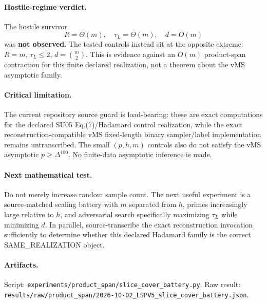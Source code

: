 \documentclass[11pt]{article}
\begin{document}
\paragraph{Hostile-regime verdict.}
The hostile survivor
\[
R=\Theta(m),\quad\tau_L=\Theta(m),\quad d=O(m)
\]
was \textbf{not observed}. The tested controls instead sit at the opposite extreme:
\(R=m\), \(\tau_L\le2\), \(d=\binom m2\). This is evidence against an \(O(m)\) product-span contraction for this finite declared realization, not a theorem about the vMS asymptotic family.

\paragraph{Critical limitation.}
The current repository source guard is load-bearing: these are exact computations for the declared SU05 Eq.(7)/Hadamard control realization, while the exact reconstruction-compatible vMS fixed-length binary sampler/label implementation remains untranscribed. The small \((p,h,m)\) controls also do not satisfy the vMS asymptotic \(p\ge\Delta^{100}\). No finite-data asymptotic inference is made.

\paragraph{Next mathematical test.}
Do not merely increase random sample count. The next useful experiment is a source-matched scaling battery with \(m\) separated from \(h\), primes increasingly large relative to \(h\), and adversarial search specifically maximizing \(\tau_L\) while minimizing \(d\). In parallel, source-transcribe the exact reconstruction invocation sufficiently to determine whether this declared Hadamard family is the correct SAME\_REALIZATION object.

\paragraph{Artifacts.}
Script: \texttt{experiments/product\_span/slice\_cover\_battery.py}. Raw result:
\texttt{results/raw/product\_span/2026-10-02\_LSPV5\_slice\_cover\_battery.json}.
\end{document}
